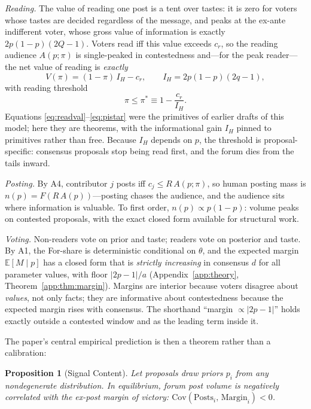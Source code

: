 \documentclass[12pt]{article}
\newtheorem{proposition}{Proposition}
\begin{document}
\emph{Reading.} The value of reading one post is a tent over tastes: it is zero for voters whose tastes are decided regardless of the message, and peaks at the ex-ante indifferent voter, whose gross value of information is exactly $2p(1-p)(2Q-1)$. Voters read iff this value exceeds $c_r$, so the reading audience $A(p;\pi)$ is single-peaked in contestedness and---for the peak reader---the net value of reading is \emph{exactly}
\begin{equation}
  V(\pi) = (1 - \pi)\,I_H - c_r, \qquad I_H = 2p(1-p)(2q-1),
  \label{eq:readval}
\end{equation}
with reading threshold
\begin{equation}
  \pi \le \pi^* \equiv 1 - \frac{c_r}{I_H}.
  \label{eq:pistar}
\end{equation}
Equations \eqref{eq:readval}--\eqref{eq:pistar} were the primitives of earlier drafts of this model; here they are theorems, with the informational gain $I_H$ pinned to primitives rather than free. Because $I_H$ depends on $p$, the threshold is proposal-specific: consensus proposals stop being read first, and the forum dies from the tails inward.

\emph{Posting.} By A4, contributor $j$ posts iff $c_j \le R\,A(p;\pi)$, so human posting mass is $n(p) = F(R\,A(p))$---posting chases the audience, and the audience sits where information is valuable. To first order, $n(p) \propto p(1-p)$: volume peaks on contested proposals, with the exact closed form available for structural work.

\emph{Voting.} Non-readers vote on prior and taste; readers vote on posterior and taste. By A1, the For-share is deterministic conditional on $\theta$, and the expected margin $\mathbb{E}[M \mid p]$ has a closed form that is \emph{strictly increasing} in consensus $d$ for all parameter values, with floor $|2p-1|/a$ (Appendix~\ref{app:theory}, Theorem~\ref{app:thm:margin}). Margins are interior because voters disagree about \emph{values}, not only facts; they are informative about contestedness because the expected margin rises with consensus. The shorthand ``margin $\propto |2p-1|$'' holds exactly outside a contested window and as the leading term inside it.

The paper's central empirical prediction is then a theorem rather than a calibration:

\begin{proposition}[Signal Content]
\label{prop:signal}
Let proposals draw priors $p_i$ from any nondegenerate distribution. In equilibrium, forum post volume is negatively correlated with the ex-post margin of victory: $\mathrm{Cov}(\text{Posts}_i, \,\text{Margin}_i) < 0$.
\end{proposition}
\end{document}
